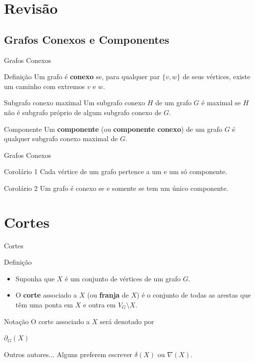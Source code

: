 \documentclass[xcolor=dvipsnames,table]{beamer}
\begin{document}
    \section{Revisão}
	\subsection{Grafos Conexos e Componentes}
	\begin{frame}{Grafos Conexos}
		\begin{block}{Definição}
			Um grafo é {\bf conexo} se, para qualquer par $\{v,w\}$ de seus vértices, existe um caminho com extremos $v$ e $w$.
		\end{block}
		\begin{block}{Subgrafo conexo maximal}
			Um subgrafo conexo $H$ de um grafo $G$ é maximal se $H$ não é subgrafo próprio de algum subgrafo conexo de $G$.
		\end{block}
		\begin{block}{Componente}
			Um {\bf componente} (ou {\bf componente conexo}) de um grafo $G$ é qualquer subgrafo conexo maximal de $G$.
		\end{block}
	\end{frame}
	
	\begin{frame}{Grafos Conexos}
		\begin{block}{Corolário 1}
			Cada vértice de um grafo pertence a um e um só componente.
		\end{block}
		\begin{block}{Corolário 2}
			Um grafo é conexo se e somente se tem um único componente.
		\end{block}
	\end{frame}

	\section{Cortes}
	\begin{frame}{Cortes}
		\begin{block}{Definição}
			\begin{itemize}
				\item Suponha que $X$ é um conjunto de vértices de um grafo $G$. \pause
				\item O {\bf corte} associado a $X$ (ou {\bf franja} de $X$) é o conjunto de todas as arestas que têm uma ponta em $X$ e outra em $V_G \setminus X$.
			\end{itemize}
		\end{block} \pause
		\begin{block}{Notação}
			O corte associado a $X$ será denotado por
			\begin{center}
				$\partial_G (X)$
			\end{center}
		\end{block} \pause
		\begin{alertblock}{Outros autores...}
			Alguns preferem escrever $\delta(X)$ ou $\nabla(X)$.
		\end{alertblock}
	\end{frame}
	
\end{document}
